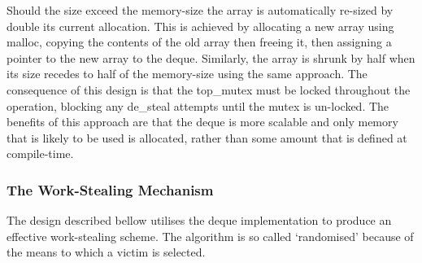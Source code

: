 Should the size exceed the memory-size the array is automatically re-sized by double its current allocation. 
This is achieved by allocating a new array using malloc, copying the contents of the old array then freeing it, 
then assigning a pointer to the new array to the deque. 
Similarly, the array is shrunk by half when its size recedes to half of the memory-size using the same approach.
The consequence of this design is that the top\_mutex must be locked throughout the operation, blocking any de\_steal
attempts until the mutex is un-locked. 
The benefits of this approach are that the deque is more scalable and only memory that is likely to be used is allocated, 
rather than some amount that is defined at compile-time.

\subsubsection*{The Work-Stealing Mechanism}

The design described bellow utilises the deque implementation to produce an effective work-stealing scheme.
The algorithm is so called `randomised' because of the means to which a victim is selected.


